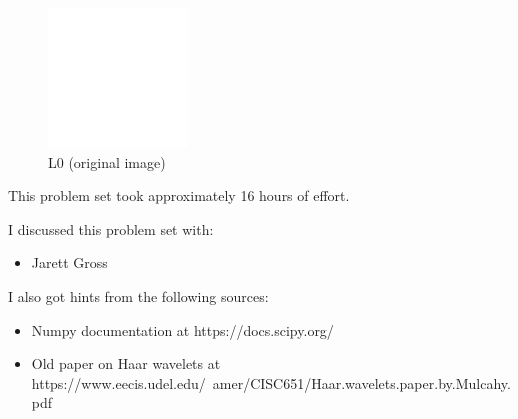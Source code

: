 \documentclass{article}
\begin{document}
\begin{figure}[!h]
  \centering
  \includegraphics[height=10em]{code/outputs/prob6b.png}
  \caption{L0 (original image)}
\end{figure}

This problem set took approximately 16 hours of effort.


I discussed this problem set with:
\begin{itemize}
\item Jarett Gross
\end{itemize}


I also got hints from the following sources:
\begin{itemize}
\item Numpy documentation at https://docs.scipy.org/
\item Old paper on Haar wavelets at https://www.eecis.udel.edu/~amer/CISC651/Haar.wavelets.paper.by.Mulcahy.pdf

\end{itemize}
\end{document}
